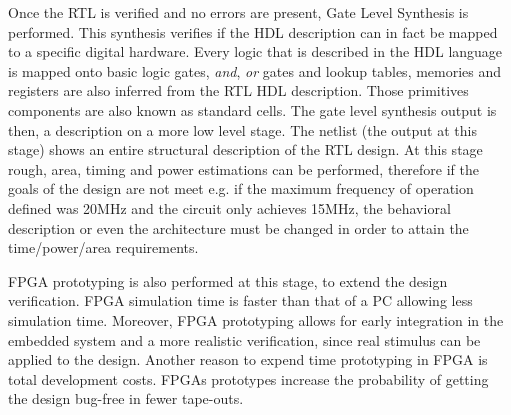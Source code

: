 Once the RTL is verified and no errors are present, Gate Level Synthesis is performed. This synthesis verifies if the HDL description can in fact be mapped to a specific digital hardware. Every logic that is described in the HDL language is mapped onto basic logic gates, \emph{and}, \emph{or} gates and lookup tables, memories and registers are also inferred from the RTL HDL description. Those primitives components are also known as standard cells. The gate level synthesis output is then, a description on a more low level stage. The netlist (the output at this stage) shows an entire structural description of the RTL design. At this stage rough, area, timing and power estimations can be performed, therefore if the goals of the design are not meet e.g. if the maximum frequency of operation defined was 20MHz and the circuit only achieves 15MHz, the behavioral description or even the architecture must be changed in order to attain the time/power/area requirements. 



FPGA prototyping is also performed at this stage, to extend the design verification. FPGA simulation time is faster than that of a PC allowing less simulation time. Moreover, FPGA prototyping allows for early integration in the embedded system and a more realistic verification, since real stimulus can be applied to the design. Another reason to expend time prototyping in FPGA is total development costs. FPGAs prototypes increase the probability of getting the design bug-free in fewer tape-outs. 



